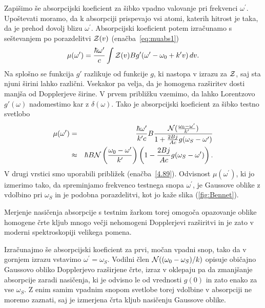 Zapišimo še absorpcijski koeficient za šibko vpadno valovanje pri 
frekvenci $\omega^{\prime}$. Upoštevati moramo, da k absorpciji prispevajo vsi atomi, katerih
hitrost je taka, da je prehod dovolj blizu $\omega^{\prime}$. Absorpcijski 
koeficient potem izračunamo s seštevanjem 
po porazdelitvi ${\cal Z}(v)$
(enačba~\ref{eq:muabs1})
\begin{equation}
\mu(\omega^{\prime})=\frac{\hbar\omega^{\prime}}{c}\int{\cal Z}(v)Bg'
(\omega^{\prime}-\omega_{0}+k'v)\, dv.
\label{4.90}
\end{equation}
Na splošno se funkcija $g'$ razlikuje od funkcije $g$, ki nastopa v izrazu za
${\cal Z}$, saj sta njuni širini lahko različni. Vsekakor pa velja, da je 
homogena razširitev dosti manjša od Dopplerjeve širine.
V prvem približku vzemimo, da lahko Lorentzovo $g'(\omega)$ nadomestimo kar z
$\delta(\omega)$. Tako je absorpcijski koeficient za šibko testno svetlobo 
\begin{eqnarray}
\mu(\omega^{\prime}) & = & \frac{\hbar\omega^{\prime}}{k'c}B\frac{{\cal N}
(\frac{\omega_0-\omega'}{k'})}{1+\frac{2Bj}{Ac}g(\omega_S-\omega')} \\ \nonumber 
 & \approx & \hbar B{\cal N}\left(\frac{\omega_0-\omega'}{k'}\right)\left(1-\frac{2Bj}{Ac}g(\omega_S-\omega')\right).
\end{eqnarray}
 V drugi vrstici smo uporabili približek (enačba~\ref{4.89}). Odvisnost $\mu(\omega^{\prime})$,
ki jo izmerimo tako, da spreminjamo frekvenco testnega snopa $\omega^{\prime}$,
je Gaussove oblike z vdolbino pri $\omega_S$ in je podobna porazdelitvi, 
kot jo kaže slika (\ref{fig:Bennet}). 

\begin{remark}
 Merjenje nasičenja absorpcije s testnim
žarkom torej omogoča opazovanje oblike homogene črte kljub mnogo večji
nehomogeni Dopplerjevi razširitvi in je zato v moderni spektroskopiji
velikega pomena.
\end{remark}

Izračunajmo še absorpcijski koeficient za prvi, močan vpadni snop, tako da v
gornjem izrazu vstavimo $\omega^{\prime}=\omega_S$. Vodilni člen ${\cal N}((\omega_0-
\omega_S)/k)$ opisuje običajno Gaussovo obliko Dopplerjevo
razširjene črte, izraz v oklepaju pa da zmanjšanje absorpcije
zaradi nasičenja, ki je odvisno le od vrednosti $g(0)$ in zato enako za vse $\omega_S$. 
Z enim samim vpadnim snopom svetlobe torej vdolbine v absorpciji ne moremo zaznati, saj 
je izmerjena črta kljub nasičenju Gaussove oblike. 

